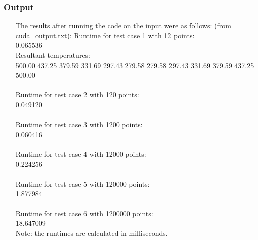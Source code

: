 \documentclass[11pt,a4paper]{article}
\begin{document}
\subsubsection{Output}
\begin{itemize}
	\item[The results after running the code on the input were as follows: (from cuda_output.txt):]
	Runtime for test case 1 with 12 points:\\
	0.065536\\
	Resultant temperatures:\\
	500.00 437.25 379.59 331.69 297.43 279.58 279.58 297.43 331.69 379.59 437.25 500.00\\
	\\
	Runtime for test case 2 with 120 points:\\
	0.049120\\
	\\
	Runtime for test case 3 with 1200 points:\\
	0.060416\\
	\\
	Runtime for test case 4 with 12000 points:\\
	0.224256\\
	\\
	Runtime for test case 5 with 120000 points:\\
	1.877984\\
	\\
	Runtime for test case 6 with 1200000 points:\\
	18.647009\\
	Note: the runtimes are calculated in milliseconds.
\end{itemize}

\newpage
{}
\end{document}
